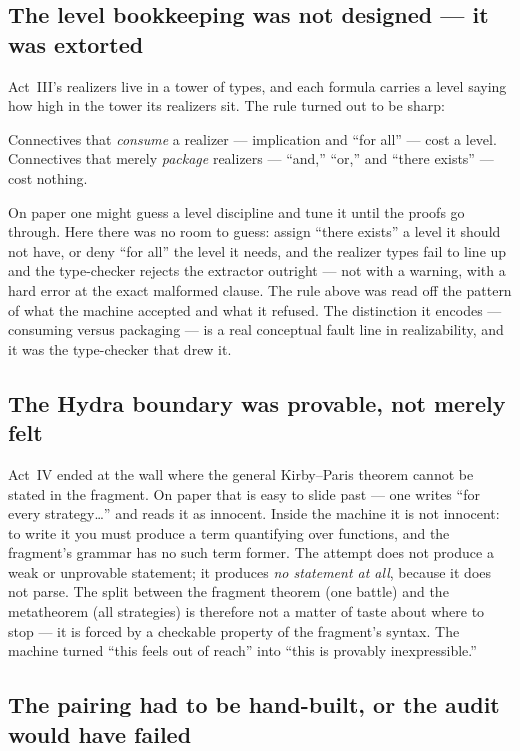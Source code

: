 \documentclass[11pt]{article}
\begin{document}
\subsection*{The level bookkeeping was not designed --- it was extorted}

Act~III's realizers live in a tower of types, and each formula carries a level
saying how high in the tower its realizers sit. The rule turned out to be
sharp:
\begin{keystmt}
Connectives that \emph{consume} a realizer --- implication and ``for all'' ---
cost a level. Connectives that merely \emph{package} realizers --- ``and,''
``or,'' and ``there exists'' --- cost nothing.
\end{keystmt}
On paper one might guess a level discipline and tune it until the proofs go
through. Here there was no room to guess: assign ``there exists'' a level it
should not have, or deny ``for all'' the level it needs, and the realizer types
fail to line up and the type-checker rejects the extractor outright --- not with
a warning, with a hard error at the exact malformed clause. The rule above was
read off the pattern of what the machine accepted and what it refused. The
distinction it encodes --- consuming versus packaging --- is a real conceptual
fault line in realizability, and it was the type-checker that drew it.

\subsection*{The Hydra boundary was provable, not merely felt}

Act~IV ended at the wall where the general Kirby--Paris theorem cannot be stated
in the fragment. On paper that is easy to slide past --- one writes ``for every
strategy\dots'' and reads it as innocent. Inside the machine it is not innocent:
to write it you must produce a term quantifying over functions, and the
fragment's grammar has no such term former. The attempt does not produce a weak
or unprovable statement; it produces \emph{no statement at all}, because it does
not parse. The split between the fragment theorem (one battle) and the
metatheorem (all strategies) is therefore not a matter of taste about where to
stop --- it is forced by a checkable property of the fragment's syntax. The
machine turned ``this feels out of reach'' into ``this is provably
inexpressible.''

\subsection*{The pairing had to be hand-built, or the audit would have failed}
\end{document}
